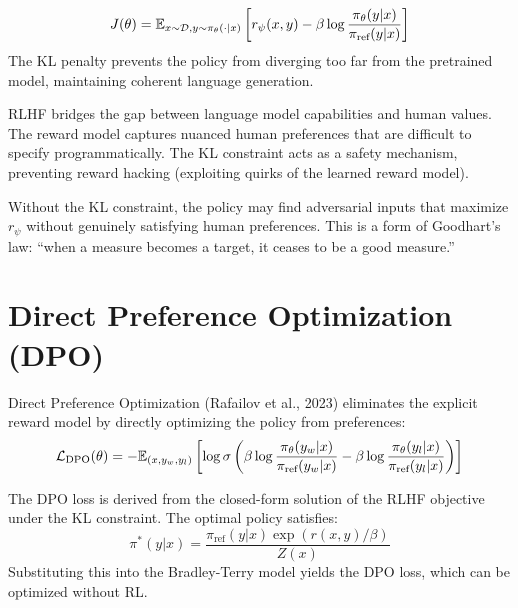 \begin{keyformulas}[title=\textbf{RLHF Objective}]
\[
    J(\theta) = \mathbb{E}_{x \sim \mathcal{D}, y \sim \pi_\theta(\cdot|x)}\left[
    r_\psi(x, y) - \beta \log \frac{\pi_\theta(y|x)}{\pi_{\text{ref}}(y|x)}
    \right]
\]
The KL penalty prevents the policy from diverging too far from the
pretrained model, maintaining coherent language generation.
\end{keyformulas}

\begin{intuition}
RLHF bridges the gap between language model capabilities and human
values. The reward model captures nuanced human preferences that are
difficult to specify programmatically. The KL constraint acts as a
safety mechanism, preventing reward hacking (exploiting quirks of the
learned reward model).
\end{intuition}

\begin{attention}[title=\textbf{Reward Hacking}]
Without the KL constraint, the policy may find adversarial inputs that
maximize $r_\psi$ without genuinely satisfying human preferences. This
is a form of Goodhart's law: ``when a measure becomes a target, it
ceases to be a good measure.''
\end{attention}

\section{Direct Preference Optimization (DPO)}
\label{sec:dpo}

\begin{definition}[DPO]
Direct Preference Optimization (Rafailov et al., 2023) eliminates the
explicit reward model by directly optimizing the policy from preferences:
\[
    \mathcal{L}_{\text{DPO}}(\theta) = -\mathbb{E}_{(x, y_w, y_l)}\left[
    \log \sigma\left(\beta \log \frac{\pi_\theta(y_w|x)}{\pi_{\text{ref}}(y_w|x)}
    - \beta \log \frac{\pi_\theta(y_l|x)}{\pi_{\text{ref}}(y_l|x)}\right)
    \right]
\]
\end{definition}

\begin{proposition}
The DPO loss is derived from the closed-form solution of the RLHF
objective under the KL constraint. The optimal policy satisfies:
\[
    \pi^*(y|x) = \frac{\pi_{\text{ref}}(y|x) \exp(r(x,y)/\beta)}{Z(x)}
\]
Substituting this into the Bradley-Terry model yields the DPO loss,
which can be optimized without RL.
\end{proposition}

